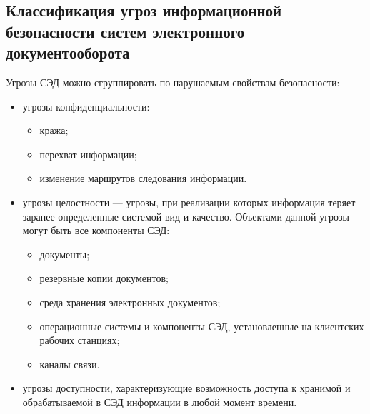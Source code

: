 \subsection{Классификация угроз информационной безопасности систем электронного документооборота} \label{threats_classification}

Угрозы СЭД можно сгруппировать по нарушаемым свойствам безопасности: 
\begin{itemize}
	\item угрозы конфиденциальности:
	\begin{itemize}
		\item кража;
		\item перехват информации;
		\item изменение маршрутов следования информации.
	\end{itemize}
	\item угрозы целостности --- угрозы, при реализации которых информация теряет заранее определенные системой вид и качество. Объектами данной угрозы могут быть все компоненты СЭД:
	\begin{itemize}
		\item документы;
		\item резервные копии документов;
		\item среда хранения электронных документов;
		\item операционные системы и компоненты СЭД, установленные на клиентских рабочих станциях;
		\item каналы связи.
	\end{itemize}
	\item угрозы доступности, характеризующие возможность доступа к хранимой и обрабатываемой в СЭД информации в любой момент времени.
\end{itemize}

